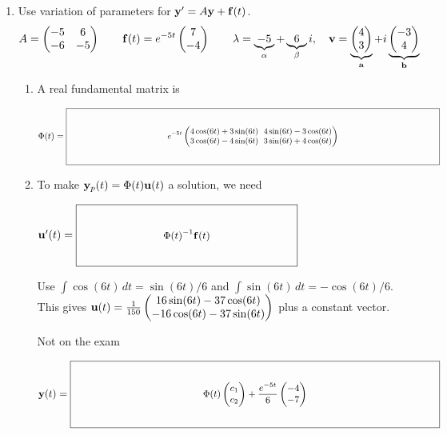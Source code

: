 \documentclass[11pt,letterpaper]{article}
\newcommand{\keybox}[3]{%
  \vcenter{\hbox{$\boxed{\parbox[c][#2][c]{#1}{\centering\small
    \setlength{\arraycolsep}{3pt}\ensuremath{\displaystyle #3}}}$}}}
\begin{document}
\begin{enumerate}
\begin{enumerate}
\noindent $\vect{y}(t)=\keybox{4.85in}{0.80in}{\Phi(t)\begin{pmatrix}c_1+t-t^2/2\\c_2+t\end{pmatrix}}$
\end{enumerate}
\item Use variation of parameters for $\mathbf{y}'=A\mathbf{y}+\mathbf{f}(t)$.
\[
A=\begin{pmatrix}-5&6\\-6&-5\end{pmatrix}
\qquad
\mathbf{f}(t)=e^{-5t}\begin{pmatrix}7\\-4\end{pmatrix}
\qquad
\lambda=\underbrace{-5}_{\alpha}+\underbrace{6}_{\beta}i,\quad
\mathbf{v}=\underbrace{\begin{pmatrix}4\\3\end{pmatrix}}_{\mathbf{a}}
+i\underbrace{\begin{pmatrix}-3\\4\end{pmatrix}}_{\mathbf{b}}
\]
\begin{enumerate}
\item A real fundamental matrix is
\par $\Phi(t)=\keybox{5.8in}{0.80in}{e^{-5t}\begin{pmatrix}
4\cos(6t)+3\sin(6t)&4\sin(6t)-3\cos(6t)\\
3\cos(6t)-4\sin(6t)&3\sin(6t)+4\cos(6t)
\end{pmatrix}}$
\item To make $\mathbf{y}_p(t)=\Phi(t)\mathbf{u}(t)$ a solution, we need
\par $\vect{u}'(t)=\keybox{2.65in}{0.68in}{\Phi(t)^{-1}\vect{f}(t)}
$
\par{\footnotesize Use $\int\cos(6t)\,dt=\sin(6t)/6$ and $\int\sin(6t)\,dt=-\cos(6t)/6$. This gives
$\mathbf{u}(t)=\frac{1}{150}\begin{pmatrix}
16\sin(6t)-37\cos(6t)\\-16\cos(6t)-37\sin(6t)
\end{pmatrix}$ plus a constant vector.}
\par\vfill
\noindent Not on the exam\par
\noindent $\vect{y}(t)=\keybox{4.85in}{0.80in}{\Phi(t)\begin{pmatrix}c_1\\c_2\end{pmatrix}
+\frac{e^{-5t}}{6}\begin{pmatrix}-4\\-7\end{pmatrix}}$
\end{enumerate}
\end{enumerate}
\end{document}
